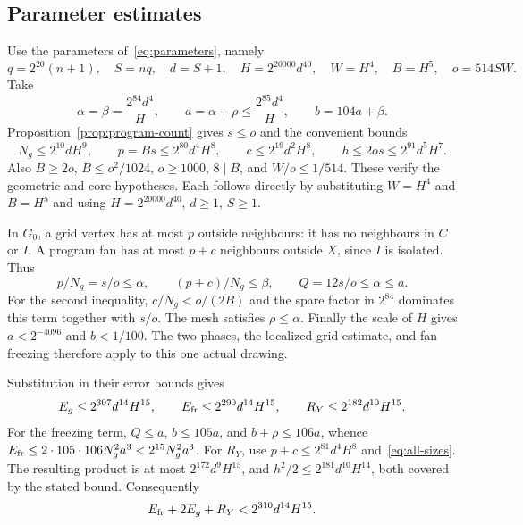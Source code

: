 \subsection{Parameter estimates}
Use the parameters of~\eqref{eq:parameters}, namely
\[
q=2^{20}(n+1),\quad S=nq,\quad d=S+1,\quad
H=2^{20000}d^{40},\quad W=H^4,\quad B=H^5,\quad o=514SW.
\]
Take
\begin{equation}\label{eq:field-scales}
\alpha=\beta=\frac{2^{84}d^4}{H},\qquad
a=\alpha+\rho\leq\frac{2^{85}d^4}{H},\qquad
b=104a+\beta.
\end{equation}
Proposition~\ref{prop:program-count} gives $s\leq o$ and the convenient bounds
\begin{equation}\label{eq:all-sizes}
N_g\leq2^{10}dH^9,\qquad p=Bs\leq2^{80}d^4H^8,\qquad
c\leq2^{19}d^2H^8,\qquad h\leq2os\leq2^{91}d^5H^7.
\end{equation}
Also $B\geq2o$, $B\leq o^2/1024$, $o\geq1000$, $8\mid B$, and $W/o\leq1/514$. These verify the geometric and core hypotheses. Each follows directly by substituting $W=H^4$ and $B=H^5$ and using $H=2^{20000}d^{40}$, $d\geq1$, $S\geq1$.

In $G_0$, a grid vertex has at most $p$ outside neighbours: it has no neighbours in $C$ or $I$. A program fan has at most $p+c$ neighbours outside $X$, since $I$ is isolated. Thus
\[
p/N_g=s/o\leq\alpha,\qquad
(p+c)/N_g\leq\beta,\qquad
Q=12s/o\leq\alpha\leq a.
\]
For the second inequality, $c/N_g<o/(2B)$ and the spare factor in $2^{84}$ dominates this term together with $s/o$. The mesh satisfies $\rho\leq\alpha$. Finally the scale of $H$ gives $a<2^{-4096}$ and $b<1/100$. The two phases, the localized grid estimate, and fan freezing therefore apply to this one actual drawing.

Substitution in their error bounds gives
\begin{equation}\label{eq:individual-errors}
E_g\leq2^{307}d^{14}H^{15},\qquad
E_{\rm fr}\leq2^{290}d^{14}H^{15},\qquad
R_Y\leq2^{182}d^{10}H^{15}.
\end{equation}
For the freezing term, $Q\leq a$, $b\leq105a$, and $b+\rho\leq106a$, whence
$E_{\rm fr}\leq2\cdot105\cdot106N_g^2a^3<2^{15}N_g^2a^3$.
For $R_Y$, use $p+c\leq2^{81}d^4H^8$ and~\eqref{eq:all-sizes}. The resulting product is at most $2^{172}d^9H^{15}$, and $h^2/2\leq2^{181}d^{10}H^{14}$, both covered by the stated bound. Consequently
\begin{equation}\label{eq:algebraic-error}
E_{\rm fr}+2E_g+R_Y<2^{310}d^{14}H^{15}.
\end{equation}

